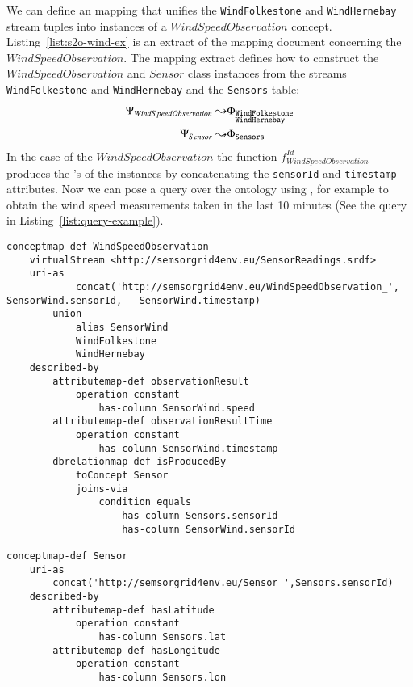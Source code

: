 \normalsize
We can define an \stwoo mapping that unifies the \texttt{WindFolkestone} and \texttt{WindHernebay} stream tuples into instances of a $WindSpeedObservation$ concept. 
Listing~\ref{list:s2o-wind-ex} is an extract of the \stwoo mapping document concerning the $WindSpeedObservation$.
The mapping extract defines how to construct the $WindSpeedObservation$ and $Sensor$ class instances from the streams \texttt{WindFolkestone} and \texttt{WindHernebay} and the \texttt{Sensors} table: 
\begin{align*}
 \Psi_{WindSpeedObservation}\leadsto 
		&\Phi_{
				\begin{subarray}{l} 
				\mathtt{WindFolkestone}\\
				\mathtt{WindHernebay} 
				\end{subarray}}\\ 
%
 \Psi_{Sensor}\leadsto 
		&\Phi_{\mathtt{Sensors}}
\end{align*} 
In the case of the $WindSpeedObservation$ the function $f_{WindSpeedObservation}^{Id}$ produces the \uri's of the instances by concatenating the \texttt{sensorId} and \texttt{timestamp} attributes.
Now we can pose a query over the ontology using \sparqlstr, for example to obtain the wind speed measurements taken in the last 10 minutes (See the query in Listing~\ref{list:query-example}).

\begin{lstlisting}[style=R2OStyle,language=R2O,frame=none,float,label=list:s2o-wind-ex,caption=\stwoo mapping from the data streams \texttt{WindFolkestone} and \texttt{WindHernebay} to the ontology concepts $WindSpeedObservation$.]
conceptmap-def WindSpeedObservation
	virtualStream <http://semsorgrid4env.eu/SensorReadings.srdf>
	uri-as
			concat('http://semsorgrid4env.eu/WindSpeedObservation_', SensorWind.sensorId, 	SensorWind.timestamp)
		union 
			alias SensorWind
			WindFolkestone
			WindHernebay
	described-by
		attributemap-def observationResult
			operation constant
				has-column SensorWind.speed
		attributemap-def observationResultTime
			operation constant
				has-column SensorWind.timestamp
		dbrelationmap-def isProducedBy
			toConcept Sensor
			joins-via
				condition equals
					has-column Sensors.sensorId
					has-column SensorWind.sensorId

conceptmap-def Sensor
	uri-as
		concat('http://semsorgrid4env.eu/Sensor_',Sensors.sensorId)
	described-by
		attributemap-def hasLatitude
			operation constant
				has-column Sensors.lat
		attributemap-def hasLongitude
			operation constant
				has-column Sensors.lon
\end{lstlisting}


